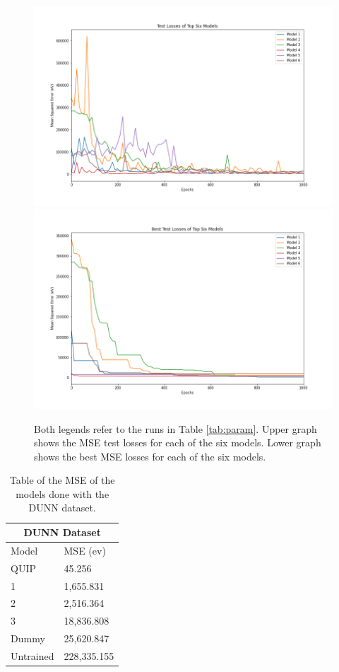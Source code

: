 \documentclass[12pt, abstract = true]{scrartcl}
\begin{document}
\begin{figure}
  \centering
  \includegraphics[scale=.5]{test.png}
  \includegraphics[scale=.5]{best.png}
  
  \caption{Both legends refer to the runs in Table \ref{tab:param}. Upper graph shows the MSE test losses for each of the six models. Lower graph shows the best MSE losses for each of the six models. }\label{fig:graph}
\end{figure}

\begin{table}
    \centering
    \begin{tabular}{p{3cm}|p{2.5cm}}
    \hline
    \multicolumn{2}{|c|}{DUNN Dataset} \\
    \hline
    Model  & MSE (ev)\\
    \hline
    QUIP   & 45.256\\
    1   & 1,655.831\\
    2    & 2,516.364\\
    3 & 18,836.808\\
    Dummy & 25,620.847\\
    Untrained & 228,335.155\\
    \hline
    \end{tabular}
    \caption{Table of the MSE of the models done with the DUNN dataset.}\label{tab:dunn}
\end{table}
\end{document}
